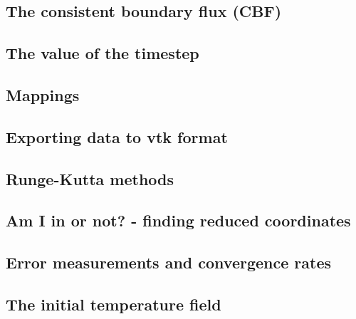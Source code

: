 \subsection{The consistent boundary flux (CBF)}  %
\newpage %
\subsection{The value of the timestep}\label{ss:cfl}  %
\newpage %
\subsection{Mappings}  %
\newpage %
\subsection{Exporting data to vtk format}  %
\newpage %
\subsection{Runge-Kutta methods}\label{ss:rkm}  %
\newpage %
\subsection{Am I in or not? - finding reduced coordinates}\label{sec:amiin} %
\newpage %
\subsection{Error measurements and convergence rates}  %
\newpage %
\subsection{The initial temperature field}  %
\newpage %
